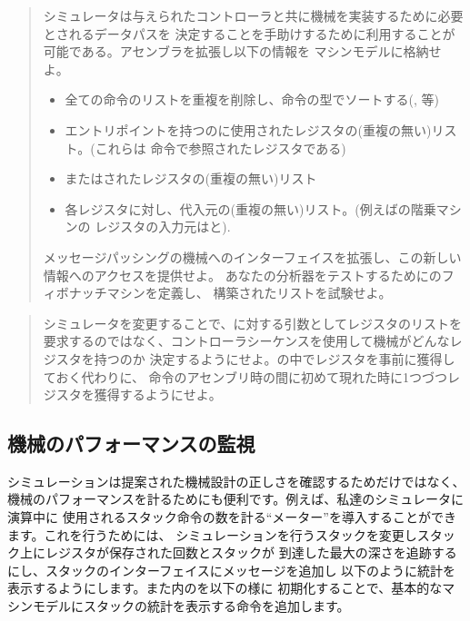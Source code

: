 \begin{quote}
シミュレータは与えられたコントローラと共に機械を実装するために必要とされるデータパスを
決定することを手助けするために利用することが可能である。アセンブラを拡張し以下の情報を
マシンモデルに格納せよ。

\begin{itemize}

\item
全ての命令のリストを重複を削除し、命令の型でソートする(, 等)

\item
エントリポイントを持つのに使用されたレジスタの(重複の無い)リスト。(これらは
命令で参照されたレジスタである)

\item
{}またはされたレジスタの(重複の無い)リスト

\item
各レジスタに対し、代入元の(重複の無い)リスト。(例えばの階乗マシンの
レジスタの入力元はと).

\end{itemize}


メッセージパッシングの機械へのインターフェイスを拡張し、この新しい情報へのアクセスを提供せよ。
あなたの分析器をテストするためにのフィボナッチマシンを定義し、
構築されたリストを試験せよ。
\end{quote}

\begin{quote}
シミュレータを変更することで、に対する引数としてレジスタのリストを
要求するのではなく、コントローラシーケンスを使用して機械がどんなレジスタを持つのか
決定するようにせよ。の中でレジスタを事前に獲得しておく代わりに、
命令のアセンブリ時の間に初めて現れた時に1つづつレジスタを獲得するようにせよ。
\end{quote}

\subsection{機械のパフォーマンスの監視}
\label{Section 5.2.4}

シミュレーションは提案された機械設計の正しさを確認するためだけではなく、
機械のパフォーマンスを計るためにも便利です。例えば、私達のシミュレータに演算中に
使用されるスタック命令の数を計る``メーター''を導入することができます。これを行うためには、
シミュレーションを行うスタックを変更しスタック上にレジスタが保存された回数とスタックが
到達した最大の深さを追跡するにし、スタックのインターフェイスにメッセージを追加し
以下のように統計を表示するようにします。また内のを以下の様に
初期化することで、基本的なマシンモデルにスタックの統計を表示する命令を追加します。

